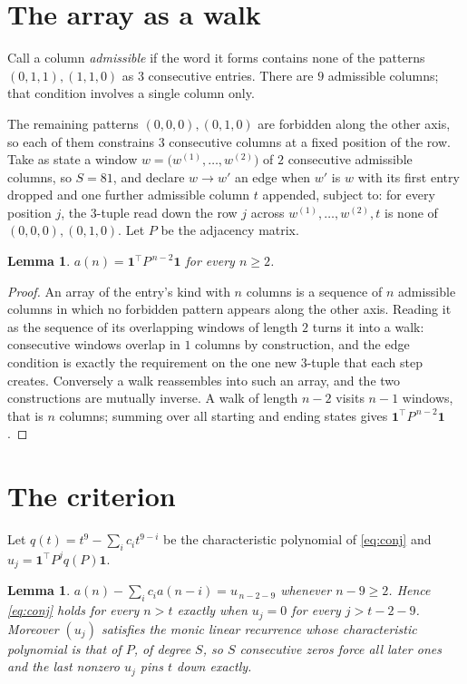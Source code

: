 \documentclass[11pt,a4paper]{article}
\theoremstyle{plain}
\newtheorem{lemma}[theorem]{Lemma}
\theoremstyle{definition}
\begin{document}
\section{The array as a walk}

Call a column \emph{admissible} if the word it forms contains none of the patterns
$(0,1,1), (1,1,0)$ as $3$ consecutive entries. There are $9$ admissible columns; that condition
involves a single column only.

The remaining patterns $(0,0,0), (0,1,0)$ are forbidden along the other axis, so each of them
constrains $3$ consecutive columns at a fixed position of the row. Take as state a
window $w=\bigl(w^{(1)},\dots,w^{(2)}\bigr)$ of $2$ consecutive admissible
columns, so $S=81$, and declare $w\to w'$ an edge when $w'$ is $w$ with its first entry
dropped and one further admissible column $t$ appended, subject to: for every position
$j$, the $3$-tuple read down the row $j$ across $w^{(1)},\dots,w^{(2)},t$
is none of $(0,0,0), (0,1,0)$. Let $P$ be the adjacency matrix.

\begin{lemma}\label{lem:walk}
$a(n)=\mathbf{1}^{\!\top}P^{\,n-2}\mathbf{1}$ for every $n\ge2$.
\end{lemma}

\begin{proof}
An array of the entry's kind with $n$ columns is a sequence of $n$ admissible columns in
which no forbidden pattern appears along the other axis. Reading it as the sequence of its
overlapping windows of length $2$ turns it into a walk: consecutive windows overlap in
$1$ columns by construction, and the edge condition is exactly the requirement on the one
new $3$-tuple that each step creates. Conversely a walk reassembles into such an array,
and the two constructions are mutually inverse. A walk of length $n-2$ visits $n-1$
windows, that is $n$ columns; summing over all starting and ending states gives
$\mathbf{1}^{\!\top}P^{\,n-2}\mathbf{1}$.
\end{proof}

\section{The criterion}

Let $q(t)=t^{9}-\sum_i c_i t^{9-i}$ be the characteristic polynomial of
\eqref{eq:conj} and $u_j=\mathbf{1}^{\!\top}P^{j}q(P)\mathbf{1}$.

\begin{lemma}\label{lem:crit}
$a(n)-\sum_i c_i a(n-i)=u_{\,n-2-9}$ whenever $n-9\ge2$. Hence
\eqref{eq:conj} holds for every $n>t$ exactly when $u_j=0$ for every
$j>t-2-9$. Moreover $(u_j)$ satisfies the monic linear recurrence whose
characteristic polynomial is that of $P$, of degree $S$, so $S$ consecutive zeros force all
later ones and the last nonzero $u_j$ pins $t$ down exactly.
\end{lemma}
\end{document}
